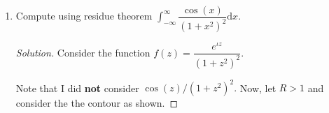 \documentclass[12pt]{article}
\theoremstyle{definition}
\newenvironment{soln}{\begin{proof}[Solution]}{\end{proof}}
\begin{document}
\begin{enumerate}[leftmargin=*]
\begin{soln}
    	Noting that $\zeta^2 = \iota,$ we see that
    	\begin{align*} 
    		I_3(R) &= -\zeta\int_{0}^{R} e^{-\iota t^2} {\mathrm{d}}t\\
    		&= -\zeta\int_{0}^{R} (\cos t^2 - \iota\sin t^2) {\mathrm{d}}t.
    	\end{align*}

    	As observed earlier, we have
    	\begin{equation*} 
    		I_1(R) + I_2(R) + I_3(R) = 0
    	\end{equation*}
    	for all $R > 0.$ Letting $R \to \infty,$ we see that $I_2(R) \to 0$ and $I_1(R) \to \dfrac{\sqrt{\pi}}{2}.$ Thus, we get

    	\begin{equation*} 
    		\zeta\int_{0}^{\infty} (\cos t^2 - \iota\sin t^2) {\mathrm{d}}t = \dfrac{\sqrt{\pi}}{2}.
    	\end{equation*}
    	Letting $C \vcentcolon= \displaystyle\int_{0}^{\infty}\cos t^2{\mathrm{d}}t$ and $S$ the analogous one for $\sin,$ we note
    	\begin{align*} 
    		\zeta(C - \iota S) &= \dfrac{\sqrt{\pi}}{2}\\
    		{\color{myupdatecolor}\implies C - \iota S} &= {\color{myupdatecolor}\dfrac{\sqrt{\pi}}{2}\zeta^{-1}}\\
    		{\color{myupdatecolor}\implies C - \iota S} &= {\color{myupdatecolor}\dfrac{\sqrt{\pi}}{2\sqrt{2}}(1 - \iota).}
    	\end{align*}
    	Since $C$ and $S$ are both real, we compare the real imaginary parts of the two sides above to get

    	\begin{equation*} 
    		C = S = \dfrac{\pi}{2\sqrt{2}},
    	\end{equation*}
    	as desired.
    \end{soln}
    \item Compute using residue theor{\color{myupdatecolor}em} $\displaystyle\int_{-\infty}^{\infty} \dfrac{\cos(x)}{(1 + x^2)^2} {\mathrm{d}}x.$
    \begin{soln}
    	Consider the function $f(z) = \dfrac{e^{\iota z}}{(1 + z^2)^2}.$

    	Note that I did \textbf{not} consider $\cos(z)/(1 + z^2)^2.$ Now, let $R > 1$ and consider the the contour as shown.


\end{soln}
\end{enumerate}
\end{document}

